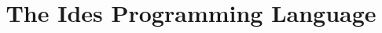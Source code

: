 \pagestyle{empty}

\setlength{\textheight}{8.75in}
\setlength{\columnsep}{2.0pc}
\setlength{\textwidth}{6.8in}
\setlength{\footheight}{0.0in}
\setlength{\topmargin}{0.25in}
\setlength{\headheight}{0.0in}
\setlength{\headsep}{0.0in}
\setlength{\oddsidemargin}{-.19in}
\setlength{\parindent}{1pc}


\makeatletter
\def\@normalsize{\@setsize\normalsize{12pt}\xpt\@xpt
\abovedisplayskip 10pt plus2pt minus5pt\belowdisplayskip \abovedisplayskip
\abovedisplayshortskip \z@ plus3pt\belowdisplayshortskip 6pt plus3pt
minus3pt\let\@listi\@listI} 

\def\code{\texttt}

\def\subsize{\@setsize\subsize{12pt}\xipt\@xipt}

\def\section{\@startsection {section}{1}{\z@}{24pt plus 2pt minus 2pt}
{12pt plus 2pt minus 2pt}{\large\bf}}

\def\subsection{\@startsection {subsection}{2}{\z@}{12pt plus 2pt minus 2pt}
{12pt plus 2pt minus 2pt}{\subsize\bf}}
\makeatother



\date{}

\title{\Large\bf The Ides Programming Language}

 
